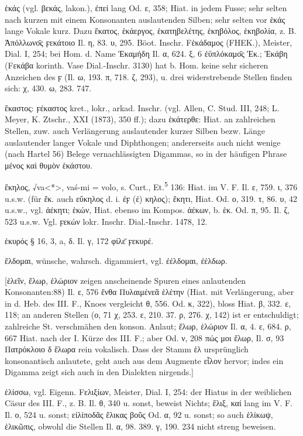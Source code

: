 ἑκάς (vgl. βεκάς, lakon.), ἐπεί lang Od. ε, 358; Hiat. in jedem Fusse; sehr
selten nach kurzen mit einem Konsonanten auslautenden Silben; sehr selten vor
ἑκάς lange Vokale kurz. Dazu ἕκατος, ἑκάεργος, ἑκατηβελέτης, ἑκηβόλος, ἑκηβολία,
z. B. Ἀπόλλωνο̄ς ϝεκάτοιο Il. η, 83. υ, 295. Böot. Inschr. Fἑκάδαμος (FΗΕΚ.),
Meister, Dial. I, 254; bei Hom. d. Name Ἑκαμήδη Il. α, 624. ξ, 6 ἐϋπλόκαμο̄ς Ἑκ.;
Ἑκάβη (Fεκάβα korinth. Vase Dial.-Inschr. 3130) hat b. Hom. keine sehr sicheren
Anzeichen des ϝ (Il. ω, 193. π, 718. ζ, 293), u. drei widerstrebende Stellen
finden sich: χ, 430. ω, 283. 747.

ἕκαστος: ϝέκαστος kret., lokr., arkad. Inschr. (vgl. Allen, C. Stud. III, 248; L. Meyer, K. Ztschr., XXI (1873), 350 ff.); dazu ἑκάτερθε: Hiat. an zahlreichen Stellen, zuw. auch Verlängerung auslautender kurzer Silben bezw. Länge auslautender langer Vokale und Diphthongen; andererseits auch nicht wenige (nach Hartel 56) Belege vernachlässigten Digammas, so in der häufigen Phrase μένος καὶ θυμὸν ἑκάστου.

ἕκηλος,  √va<*>, vaś-mi = volo, s. Curt., Et.\textsuperscript{5} 136: Hiat. im V. F. Il. ε, 759. ι, 376 u.s.w. (für ἕκ. auch εὔκηλος d. i. ἐϝ (έ) κηλος); ἕκητι, Hiat. Od. ο, 319. τ, 86. υ, 42 u.s.w., vgl. ἀέκητι; ἑκών, Hiat. ebenso im Kompos. ἀέκων, b. ἑκ. Od. π, 95. Il. ζ, 523 u.s.w. Vgl. ϝεκών lokr. Inschr. Dial.-Inschr. 1478, 12.

ἑκυρός § 16, 3, a, δ. Il. γ, 172 φίλε̄ ϝεκυρέ.

ἔλδομαι, wünsche, wahrsch. digammiert, vgl. ἐέλδομαι, ἐέλδωρ.

[ἑλεῖν, ἕλωρ, ἑλώριον zeigen anscheinende Spuren eines anlautenden Konsonanten:88) Il. ε, 576 ἔνθα Πυλαιμένεᾶ ἑλέτην (Hiat. mit Verlängerung, aber in d. Heb. des III. F., Knoes vergleicht θ, 556. Od. κ, 322), bloss Hiat. β, 332. ε, 118; an anderen Stellen (ο, 71 χ, 253. ε, 210. 37. ρ, 276. χ, 142) ist er entschuldigt; zahlreiche St. verschmähen den konson. Anlaut; ἕλωρ, ἑλώριον Il. α, 4. ε, 684. ρ, 667 Hiat. nach der I. Kürze des III. F.; aber Od. ν, 208 πώς μοι ἕλωρ, Il. σ, 93 Πατρόκλοιο δ ἕλωρα rein vokalisch. Dass der Stamm ἑλ ursprünglich konsonantisch anlautete, geht auch aus dem Augmente εἶλον hervor; indes ein Digamma zeigt sich auch in den Dialekten nirgends.]

ἑλίσσω, vgl.  Eigenn. Fελιξίων, Meister, Dial. I, 254: der Hiatus in der weiblichen Cäsur des III. F., z. B. Il. θ, 340 u. sonst, beweist Nichts; ἕλιξ, καί lang im V. F. Il. ο, 524 u. sonst; εἰλίποδᾶς ἕλικας βοῦς Od. α, 92 u. sonst; so auch ἑλίκωψ, ἑλικῶπις, obwohl die Stellen Il. α, 98. 389. γ, 190. 234 nicht streng beweisen.

